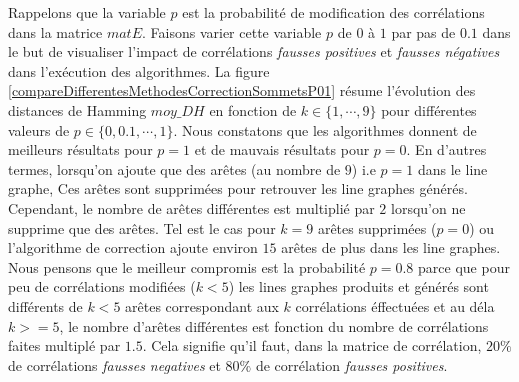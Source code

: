 \documentclass[onecolumn, 12pt]{book}
\begin{document}
Rappelons que la variable $p$ est la probabilit\'e de modification des corr\'elations dans la matrice $matE$.
Faisons varier cette variable $p$ de $0$ \`a $1$ par pas de $0.1$ dans le but de visualiser l'impact de corr\'elations {\em fausses positives} et {\em fausses n\'egatives} dans l'ex\'ecution des algorithmes. 
La figure \ref{compareDifferentesMethodesCorrectionSommetsP01} r\'esume l'\'evolution des distances de Hamming $moy\_DH$ en fonction de  $k \in \{1, \cdots, 9\}$ pour diff\'erentes valeurs de $p \in \{0,0.1,\cdots,1\}$.
Nous constatons que les algorithmes donnent de meilleurs r\'esultats pour $p = 1$ et de mauvais r\'esultats pour $p = 0$. En d'autres termes, lorsqu'on ajoute que des ar\^etes (au nombre de $9$) i.e $p = 1$ dans le line graphe, Ces ar\^etes sont supprim\'ees  pour retrouver les line graphes g\'en\'er\'es. Cependant, le nombre de ar\^etes diff\'erentes est multipli\'e par $2$ lorsqu'on ne  supprime que des ar\^etes. Tel est le cas pour $k = 9$ ar\^etes supprim\'ees ($p = 0$) ou l'algorithme de correction ajoute environ $15$ ar\^etes de plus dans les line graphes. 
Nous pensons que le meilleur compromis est la probabilit\'e $p = 0.8$ parce que pour peu de corr\'elations modifi\'ees ($k<5$) les lines graphes produits et g\'en\'er\'es sont diff\'erents de $k<5$ ar\^etes correspondant aux $k$ corr\'elations \'effectu\'ees  et au d\'ela $k>= 5$, le nombre d'ar\^etes diff\'erentes est fonction du nombre de corr\'elations faites multipl\'e par $1.5$.
Cela signifie qu'il faut, dans la matrice de corr\'elation, $20\%$ de corr\'elations {\em fausses negatives} et $80\%$ de corr\'elation {\em fausses positives}. 
\end{document}
